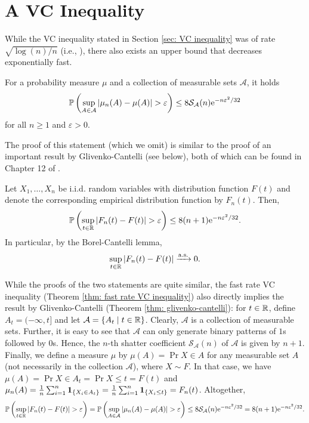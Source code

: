 \section{A  VC Inequality}

While the VC inequality stated in Section \ref{sec: VC inequality} was of rate $\sqrt{\log(n) / n}$ (i.e., ), there also exists an upper bound that decreases exponentially fast.

\begin{theorem}
\label{thm: fast rate VC inequality}
For a probability measure $\mu$ and a collection of measurable sets $\mathcal{A}$, it holds
\[
    \mathbb{P}\left( \sup_{A \in \mathcal{A}} \abs{\mu_n(A) - \mu(A)} > \varepsilon \right) \leq 8 \mathcal{S}_{\mathcal{A}}(n) \mathrm{e}^{-n\varepsilon^2/32}
\]
for all $n \geq 1$ and $\varepsilon > 0$.
\end{theorem}

The proof of this statement (which we omit) is similar to the proof of an important result by Glivenko-Cantelli (see below), both of which can be found in Chapter 12 of  \cite{devroye1996probabilistic}.

\begin{theorem}
\label{thm: glivenko-cantelli}
Let $X_1, \dots, X_n$ be i.i.d. random variables with distribution function $F(t)$ and denote the corresponding empirical distribution function by $F_n(t)$. Then,
\[
    \mathbb{P}\left( \sup_{t\in\mathbb{R}} \abs{F_n(t) - F(t)} > \varepsilon \right) \leq 8(n+1) \mathrm{e}^{-n\varepsilon^2/32}.
\]
In particular, by the Borel-Cantelli lemma,
\[
    \sup_{t\in\mathbb{R}} \abs{F_n(t) - F(t)} \xrightarrow{\mathrm{a.s.}} 0.
\]
\end{theorem}

\begin{remark}
While the proofs of the two statements are quite similar, the fast rate VC inequality (Theorem \ref{thm: fast rate VC inequality}) also directly implies the result by Glivenko-Cantelli (Theorem \ref{thm: glivenko-cantelli}): for $t \in \mathbb{R}$, define $A_t = (-\infty, t]$ and let $\mathcal{A} = \left\{A_t \mathrel{|} t \in \mathbb{R}\right\}$. Clearly, $\mathcal{A}$ is a collection of measurable sets. Further, it is easy to see that $\mathcal{A}$ can only generate binary patterns of $1$s followed by $0$s. Hence, the $n$-th shatter coefficient $\mathcal{S}_{\mathcal{A}}(n)$ of $\mathcal{A}$ is given by $n+1$. Finally, we define a measure $\mu$ by $\mu(A) = \Pr{X \in A}$ for any measurable set $A$ (not necessarily in the collection $\mathcal{A}$), where $X \sim F$. In that case, we have $\mu(A) = \Pr{X \in A_t} = \Pr{X \leq t} = F(t)$ and $\mu_n(A) = \frac{1}{n} \sum_{i=1}^n \mathbf{1}_{\left\{X_i \in A_t\right\}} = \frac{1}{n} \sum_{i=1}^n \mathbf{1}_{\left\{X_i \leq t\right\}} = F_n(t)$. Altogether,
\[
    \mathbb{P}\left( \sup_{t\in\mathbb{R}} \abs{F_n(t) - F(t)} > \varepsilon \right) = \mathbb{P}\left( \sup_{A \in \mathcal{A}} \abs{\mu_n(A) - \mu(A)} > \varepsilon \right) \leq 8 \mathcal{S}_{\mathcal{A}}(n) \mathrm{e}^{-n\varepsilon^2/32} = 8 (n+1) \mathrm{e}^{-n\varepsilon^2/32}.
\]
\end{remark}
